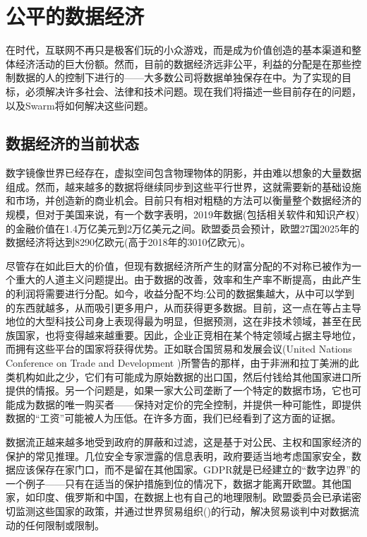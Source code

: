 \section{公平的数据经济}\label{sec:fair-data}
\green{}

在时代，互联网不再只是极客们玩的小众游戏，而是成为价值创造的基本渠道和整体经济活动的巨大份额。然而，目前的数据经济远非公平，利益的分配是在那些控制数据的人的控制下进行的——大多数公司将数据单独保存在中。为了实现的目标，必须解决许多社会、法律和技术问题。现在我们将描述一些目前存在的问题，以及Swarm将如何解决这些问题。 

\subsection{数据经济的当前状态\statusgreen} \label{sec:dataeconomy}

数字镜像世界已经存在，虚拟空间包含物理物体的阴影，并由难以想象的大量数据\cite{MirrorWorlds2020Feb}组成。然而，越来越多的数据将继续同步到这些平行世界，这就需要新的基础设施和市场，并创造新的商业机会。目前只有相对粗糙的方法可以衡量整个数据经济的规模，但对于美国来说，有一个数字表明，2019年数据(包括相关软件和知识产权)的金融价值在1.4万亿美元到2万亿美元之间。欧盟委员会预计，欧盟27国2025年的数据经济将达到8290亿欧元(高于2018年的3010亿欧元)。

尽管存在如此巨大的价值，但现有数据经济所产生的财富分配的不对称已被作为一个重大的人道主义问题提出。由于数据的改善，效率和生产率不断提高，由此产生的利润将需要进行分配。如今，收益分配不均:公司的数据集越大，从中可以学到的东西就越多，从而吸引更多用户，从而获得更多数据。目前，这一点在等占主导地位的大型科技公司身上表现得最为明显，但据预测，这在非技术领域，甚至在民族国家，也将变得越来越重要。因此，企业正竞相在某个特定领域占据主导地位，而拥有这些平台的国家将获得优势。正如联合国贸易和发展会议(United Nations Conference on Trade and Development \cite{TheWinner2020Feb})所警告的那样，由于非洲和拉丁美洲的此类机构如此之少，它们有可能成为原始数据的出口国，然后付钱给其他国家进口所提供的情报。另一个问题是，如果一家大公司垄断了一个特定的数据市场，它也可能成为数据的唯一购买者——保持对定价的完全控制，并提供一种可能性，即提供数据的“工资”可能被人为压低。在许多方面，我们已经看到了这方面的证据。 


数据流正越来越多地受到政府的屏蔽和过滤，这是基于对公民、主权和国家经济的保护的常见推理。几位安全专家泄露的信息表明，政府要适当地考虑国家安全，数据应该保存在家门口，而不是留在其他国家。GDPR就是已经建立的“数字边界”的一个例子——只有在适当的保护措施到位的情况下，数据才能离开欧盟。其他国家，如印度、俄罗斯和中国，在数据上也有自己的地理限制。欧盟委员会已承诺密切监测这些国家的政策，并通过世界贸易组织(\cite{EUWhitePaperAI2020Feb})的行动，解决贸易谈判中对数据流动的任何限制或限制。

